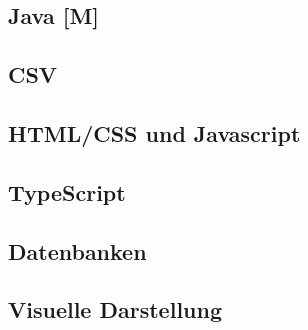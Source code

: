 

\begin{spacing}{1}
    \section{Java [M]}\label{section:allTechJava}
    \end{spacing}


\begin{spacing}{1}
    \section{CSV}\label{section:allTechCSV}
    \end{spacing}


\begin{spacing}{1}
    \section{HTML/CSS und Javascript}\label{section:allTechHTMLCSS}
    \end{spacing}

 
\begin{spacing}{1}
    \section{TypeScript}\label{section:allTechTypescript}
    \end{spacing}

 
\begin{spacing}{1}
    \section{Datenbanken}\label{section:database}
    \end{spacing}


\begin{spacing}{1}
    \section{Visuelle Darstellung}\label{section:gui}
    \end{spacing}


